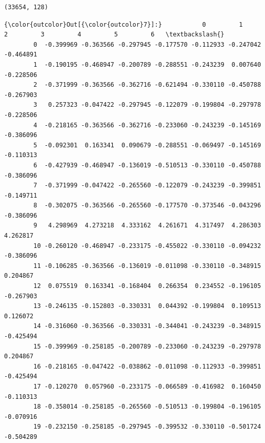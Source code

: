 \documentclass[11pt]{article}
\begin{document}
    \begin{Verbatim}[commandchars=\\\{\}]
(33654, 128)

    \end{Verbatim}

\begin{Verbatim}[commandchars=\\\{\}]
{\color{outcolor}Out[{\color{outcolor}7}]:}           0         1         2         3         4         5         6   \textbackslash{}
        0  -0.399969 -0.363566 -0.297945 -0.177570 -0.112933 -0.247042 -0.464891   
        1  -0.190195 -0.468947 -0.200789 -0.288551 -0.243239  0.007640 -0.228506   
        2  -0.371999 -0.363566 -0.362716 -0.621494 -0.330110 -0.450788 -0.267903   
        3   0.257323 -0.047422 -0.297945 -0.122079 -0.199804 -0.297978 -0.228506   
        4  -0.218165 -0.363566 -0.362716 -0.233060 -0.243239 -0.145169 -0.386096   
        5  -0.092301  0.163341  0.090679 -0.288551 -0.069497 -0.145169 -0.110313   
        6  -0.427939 -0.468947 -0.136019 -0.510513 -0.330110 -0.450788 -0.386096   
        7  -0.371999 -0.047422 -0.265560 -0.122079 -0.243239 -0.399851 -0.149711   
        8  -0.302075 -0.363566 -0.265560 -0.177570 -0.373546 -0.043296 -0.386096   
        9   4.298969  4.273218  4.333162  4.261671  4.317497  4.286303  4.262817   
        10 -0.260120 -0.468947 -0.233175 -0.455022 -0.330110 -0.094232 -0.386096   
        11 -0.106285 -0.363566 -0.136019 -0.011098 -0.330110 -0.348915  0.204867   
        12  0.075519  0.163341 -0.168404  0.266354  0.234552 -0.196105 -0.267903   
        13 -0.246135 -0.152803 -0.330331  0.044392 -0.199804  0.109513  0.126072   
        14 -0.316060 -0.363566 -0.330331 -0.344041 -0.243239 -0.348915 -0.425494   
        15 -0.399969 -0.258185 -0.200789 -0.233060 -0.243239 -0.297978  0.204867   
        16 -0.218165 -0.047422 -0.038862 -0.011098 -0.112933 -0.399851 -0.425494   
        17 -0.120270  0.057960 -0.233175 -0.066589 -0.416982  0.160450 -0.110313   
        18 -0.358014 -0.258185 -0.265560 -0.510513 -0.199804 -0.196105 -0.070916   
        19 -0.232150 -0.258185 -0.297945 -0.399532 -0.330110 -0.501724 -0.504289   
        

\end{Verbatim}
\end{document}
